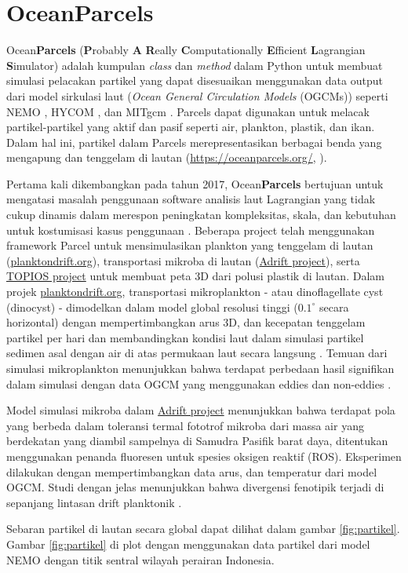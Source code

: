\section[OceanParcels]{OceanParcels}
\begin{spacing}{1.5}
	\justifying
	Ocean\textbf{Parcels} (\textbf{P}robably \textbf{A} \textbf{R}eally \textbf{C}omputationally \textbf{E}fficient \textbf{L}agrangian \textbf{S}imulator) adalah kumpulan \textit{class} dan \textit{method} dalam Python untuk membuat simulasi pelacakan partikel yang dapat disesuaikan menggunakan data output dari model sirkulasi laut (\textit{Ocean General Circulation Models} (OGCMs)) seperti NEMO , HYCOM , dan MITgcm . Parcels dapat digunakan untuk melacak partikel-partikel yang aktif dan pasif seperti air, plankton, plastik, dan ikan. Dalam hal ini, partikel dalam Parcels merepresentasikan berbagai benda yang mengapung dan tenggelam di lautan (\href{https://oceanparcels.org/}{https://oceanparcels.org/}, ).
	\par Pertama kali dikembangkan pada tahun 2017, Ocean\textbf{Parcels} bertujuan untuk mengatasi masalah penggunaan software analisis laut Lagrangian yang tidak cukup dinamis dalam merespon peningkatan kompleksitas, skala, dan kebutuhan untuk kostumisasi kasus penggunaan . Beberapa project telah menggunakan framework Parcel untuk mensimulasikan plankton yang tenggelam di lautan (\href{https://planktondrift.science.uu.nl/}{planktondrift.org}), transportasi mikroba di lautan (\href{https://adrift-project.com/}{Adrift project}), serta \href{http://topios.org/}{TOPIOS project} untuk membuat peta 3D dari polusi plastik di lautan. Dalam projek \href{https://planktondrift.science.uu.nl/}{planktondrift.org}, transportasi mikroplankton - atau dinoflagellate cyst (dinocyst) - dimodelkan dalam model global resolusi tinggi ($0.1^\circ$ secara horizontal) dengan mempertimbangkan arus 3D, dan kecepatan tenggelam partikel per hari dan membandingkan kondisi laut dalam simulasi partikel sedimen asal dengan air di atas permukaan laut secara langsung . Temuan dari simulasi mikroplankton menunjukkan bahwa terdapat perbedaan hasil signifikan dalam simulasi dengan data OGCM yang menggunakan eddies dan non-eddies . 
	\par Model simulasi mikroba dalam \href{https://adrift-project.com/}{Adrift project} menunjukkan bahwa terdapat pola yang berbeda dalam toleransi termal fototrof mikroba dari massa air yang berdekatan yang diambil sampelnya di Samudra Pasifik barat daya, ditentukan menggunakan penanda fluoresen untuk spesies oksigen reaktif (ROS). Eksperimen dilakukan dengan mempertimbangkan data arus, dan temperatur dari model OGCM. Studi dengan jelas menunjukkan bahwa divergensi fenotipik terjadi di sepanjang lintasan drift planktonik .
	\par Sebaran partikel di lautan secara global dapat dilihat dalam gambar \ref{fig:partikel}. Gambar \ref{fig:partikel} di plot dengan menggunakan data partikel dari model NEMO dengan titik sentral wilayah perairan Indonesia.
	

\end{spacing}
